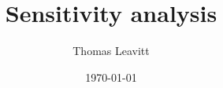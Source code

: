 \documentclass[table, xcolor={dvipsnames}, 9pt]{beamer}
\title[]{Sensitivity analysis} %
\author{Thomas Leavitt} %
\institute[] %
{
\medskip
\textit{} %
}
\date{\today} %
\theoremstyle{newstyle}
\begin{document}
\begin{frame}
\titlepage %
\end{frame}


\end{document}
